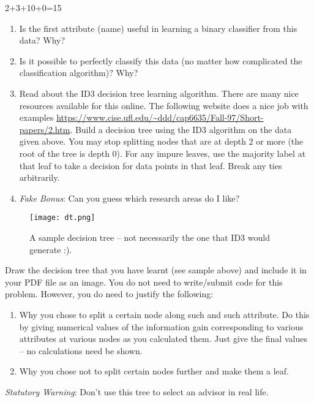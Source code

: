 \documentclass[a4paper,11pt]{article}
\begin{document}
\begin{mlproblem}{2+3+10+0=15}
\begin{enumerate}
	\item Is the first attribute (name) useful in learning a binary classifier from this data? Why?
	\item Is it possible to perfectly classify this data (no matter how complicated the classification algorithm)? Why?
	\item Read about the ID3 decision tree learning algorithm. There are many nice resources available for this online. The following website does a nice job with examples \url{https://www.cise.ufl.edu/~ddd/cap6635/Fall-97/Short-papers/2.htm}. Build a decision tree using the ID3 algorithm on the data given above. You may stop splitting nodes that are at depth 2 or more (the root of the tree is depth 0). For any impure leaves, use the majority label at that leaf to take a decision for data points in that leaf. Break any ties arbitrarily.
	\item \emph{Fake Bonus}: Can you guess which research areas do I like?
\end{enumerate}

\begin{figure}[h!]%
\centering
\texttt{[image: dt.png]}%
\caption{A sample decision tree -- not necessarily the one that ID3 would generate :).}%
\end{figure}

Draw the decision tree that you have learnt (see sample above) and include it in your PDF file as an image. You do not need to write/submit code for this problem. However, you do need to justify the following:
\begin{enumerate}
	\item Why you chose to split a certain node along such and such attribute. Do this by giving numerical values of the information gain corresponding to various attributes at various nodes as you calculated them. Just give the final values -- no calculations need be shown.
	\item Why you chose not to split certain nodes further and make them a leaf.
\end{enumerate}
\emph{Statutory Warning}: Don't use this tree to select an advisor in real life.
\end{mlproblem}
\end{document}
